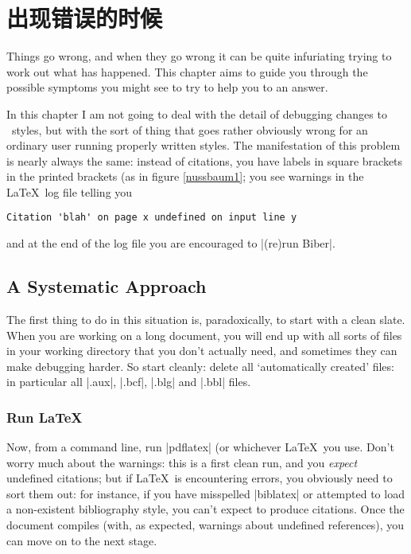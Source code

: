 \chapter{出现错误的时候}\label{ch:troubleshooting}

Things go wrong, and when they go wrong it can be quite infuriating
trying to work out what has happened. This chapter aims to guide you
through the possible symptoms you might see to try to help you to an
answer.

In this chapter I am not going to deal with the detail of debugging
changes to \biblatex\ styles, but with the sort of thing that goes
rather obviously wrong for an ordinary user running properly written
styles. The manifestation of this problem is nearly always the same:
instead of citations, you have labels in square brackets in the
printed brackets (as in figure \ref{nussbaum1}; you see warnings in
the \LaTeX\ log file telling you
\begin{verbatim}
Citation 'blah' on page x undefined on input line y
\end{verbatim}
and at the end of the log file you are encouraged to |(re)run Biber|.

\section{A Systematic Approach}

The first thing to do in this situation is, paradoxically, to start
with a clean slate.
When you are working on a long document, you will end up with all
sorts of files in your working directory that you don't actually need,
and sometimes they can make debugging harder. So start cleanly: delete
all `automatically created' files: in particular all |.aux|, |.bcf|,
|.blg| and |.bbl| files.

\subsection{Run \LaTeX}

Now, from a command line, run |pdflatex|  (or
whichever \LaTeX\ you use. Don't worry much about the warnings: this
is a first clean run, and you \emph{expect} undefined citations; but
if \LaTeX\ is encountering errors, you obviously need to sort them
out: for instance, if you have misspelled |biblatex| or attempted to
load a non-existent bibliography style, you can't expect to produce
citations. Once the document compiles (with, as expected, warnings
about undefined references), you can move on to the next stage.

